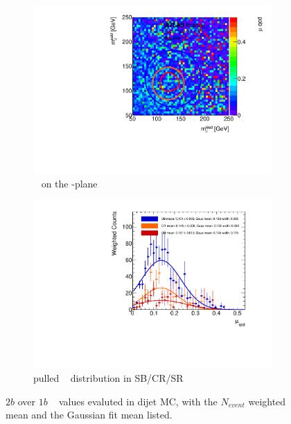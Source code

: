 \begin{figure}[htbp!]
\centering
\captionsetup{justification=centering}
	\hspace{-1cm}
    \begin{subfigure}[b]{0.4\textwidth}
        \includegraphics[width=\textwidth,angle=-90]{figures/boosted/AppendixMuqcdstudy/QCD_TwoTag_Incl_mH0H1.pdf}
        \caption{\muqcd~ on the \mleadJ-\msublJ plane}
        \label{fig:app-muqcd-2b-2d-qcd}
    \end{subfigure}
    \quad \quad \quad \quad 
    \begin{subfigure}[b]{0.4\textwidth}
        \includegraphics[width=\textwidth,angle=-90]{figures/boosted/AppendixMuqcdstudy/QCD_TwoTag_Incl_mH0H1_pull.pdf}
        \caption{pulled \muqcd~ distribution in SB/CR/SR}
        \label{fig:app-muqcd-2b-pull-qcd}
    \end{subfigure}
\caption{$2b$ over $1b$ \muqcd~ values evaluted in dijet MC, with the $N_{event}$ weighted mean and the Gaussian fit mean listed.}
\label{fig:app-muqcd-2b-qcd}
\end{figure}

